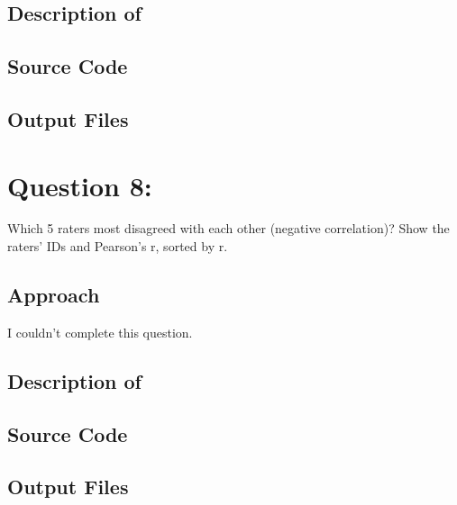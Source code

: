 \documentclass[12pt]{article}
\begin{document}
\subsection{Description of}


\subsection{Source Code}



\subsection{Output Files}

\newpage
\section{Question 8:}
 Which 5 raters most disagreed with each other (negative
correlation)? Show the raters' IDs and Pearson's r, sorted by r.
\subsection{Approach}
I couldn't complete this question.
\subsection{Description of}


\subsection{Source Code}



\subsection{Output Files}

\newpage
\end{document}
